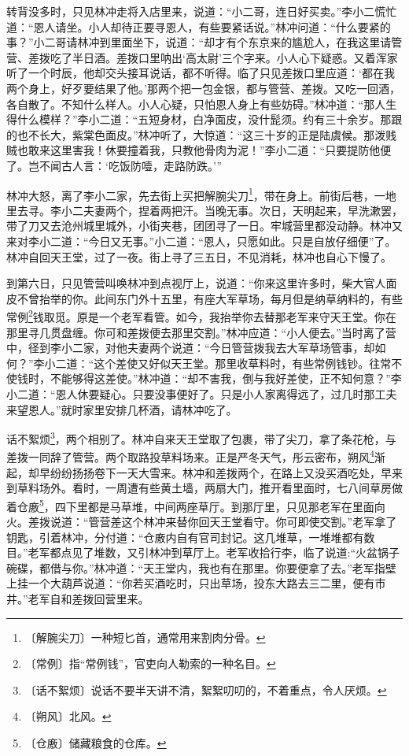 \documentclass[12pt,UTF-8,openany]{ctexbook}
\begin{document}
\begin{normalsize}
    转背没多时，只见林冲走将入店里来，说道：“小二哥，连日好买卖。”李小二慌忙道：“恩人请坐。小人却待正要寻恩人，有些要紧话说。”林冲问道：“什么要紧的事？”小二哥请林冲到里面坐下，说道：“却才有个东京来的尴尬人，在我这里请管营、差拨吃了半日酒。差拨口里呐出‘高太尉’三个字来。小人心下疑惑。又着浑家听了一个时辰，他却交头接耳说话，都不听得。临了只见差拨口里应道：‘都在我两个身上，好歹要结果了他。’那两个把一包金银，都与管营、差拨。又吃一回酒，各自散了。不知什么样人。小人心疑，只怕恩人身上有些妨碍。”林冲道：“那人生得什么模样？”李小二道：“五短身材，白净面皮，没什髭须。约有三十余岁。那跟的也不长大，紫棠色面皮。”林冲听了，大惊道：“这三十岁的正是陆虞候。那泼贱贼也敢来这里害我！休要撞着我，只教他骨肉为泥！”李小二道：“只要提防他便了。岂不闻古人言：‘吃饭防噎，走路防跌。’”
    
    林冲大怒，离了李小二家，先去街上买把解腕尖刀\footnote{〔解腕尖刀〕一种短匕首，通常用来割肉分骨。}，带在身上。前街后巷，一地里去寻。李小二夫妻两个，捏着两把汗。当晚无事。次日，天明起来，早洗漱罢，带了刀又去沧州城里城外，小街夹巷，团团寻了一日。牢城营里都没动静。林冲又来对李小二道：“今日又无事。”小二道：“恩人，只愿如此。只是自放仔细便”了。林冲自回天王堂，过了一夜。街上寻了三五日，不见消耗，林冲也自心下慢了。
    
    到第六日，只见管营叫唤林冲到点视厅上，说道：“你来这里许多时，柴大官人面皮不曾抬举的你。此间东门外十五里，有座大军草场，每月但是纳草纳料的，有些常例\footnote{〔常例〕指“常例钱”，官吏向人勒索的一种名目。}钱取觅。原是一个老军看管。如今，我抬举你去替那老军来守天王堂。你在那里寻几贯盘缠。你可和差拨便去那里交割。”林冲应道：“小人便去。”当时离了营中，径到李小二家，对他夫妻两个说道：“今日管营拨我去大军草场管事，却如何？”李小二道：“这个差使又好似天王堂。那里收草料时，有些常例钱钞。往常不使钱时，不能够得这差使。”林冲道：“却不害我，倒与我好差使，正不知何意？”李小二道：“恩人休要疑心。只要没事便好了。只是小人家离得远了，过几时那工夫来望恩人。”就时家里安排几杯酒，请林冲吃了。
    
    话不絮烦\footnote{〔话不絮烦〕说话不要半天讲不清，絮絮叨叨的，不着重点，令人厌烦。}，两个相别了。林冲自来天王堂取了包裹，带了尖刀，拿了条花枪，与差拨一同辞了管营。两个取路投草料场来。正是严冬天气，彤云密布，朔风\footnote{〔朔风〕北风。}渐起，却早纷纷扬扬卷下一天大雪来。林冲和差拨两个，在路上又没买酒吃处，早来到草料场外。看时，一周遭有些黄土墙，两扇大门，推开看里面时，七八间草房做着仓廒\footnote{〔仓廒〕储藏粮食的仓库。}，四下里都是马草堆，中间两座草厅。到那厅里，只见那老军在里面向火。差拨说道：“管营差这个林冲来替你回天王堂看守。你可即使交割。”老军拿了钥匙，引着林冲，分付道：“仓廒内自有官司封记。这几堆草，一堆堆都有数目。”老军都点见了堆数，又引林冲到草厅上。老军收拾行李，临了说道:“火盆锅子碗碟，都借与你。”林冲道：“天王堂内，我也有在那里。你要便拿了去。”老军指壁上挂一个大葫芦说道：“你若买酒吃时，只出草场，投东大路去三二里，便有市井。”老军自和差拨回营里来。
    

\end{normalsize}
\end{document}
